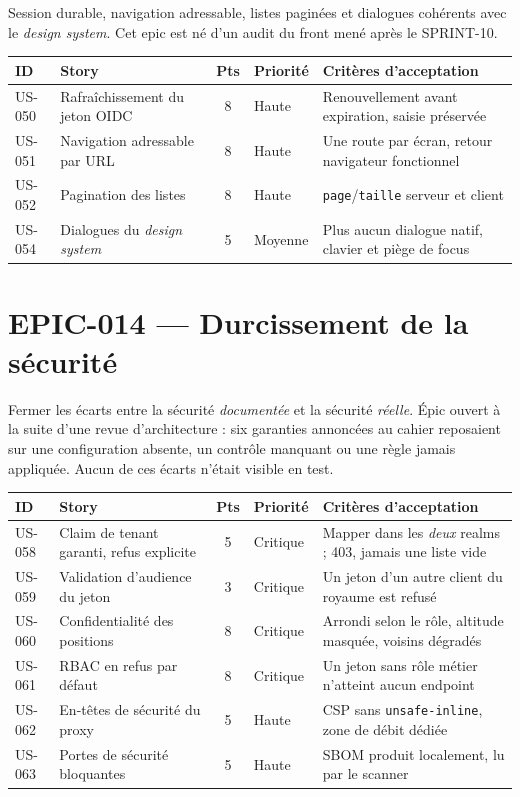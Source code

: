 Session durable, navigation adressable, listes paginées et dialogues cohérents
avec le \emph{design system}. Cet epic est né d'un audit du front mené après le
SPRINT-10.

\begin{center}
\begin{tabular}{lp{6.6cm}cl p{4.6cm}}
\toprule
\textbf{ID} & \textbf{Story} & \textbf{Pts} & \textbf{Priorité} & \textbf{Critères d'acceptation} \\
\midrule
US-050 & Rafraîchissement du jeton OIDC      & 8  & Haute   & Renouvellement avant expiration, saisie préservée \\
US-051 & Navigation adressable par URL       & 8  & Haute   & Une route par écran, retour navigateur fonctionnel \\
US-052 & Pagination des listes               & 8  & Haute   & \texttt{page}/\texttt{taille} serveur et client \\
US-054 & Dialogues du \emph{design system}   & 5  & Moyenne & Plus aucun dialogue natif, clavier et piège de focus \\
\bottomrule
\end{tabular}
\end{center}

\section{EPIC-014 --- Durcissement de la sécurité}

Fermer les écarts entre la sécurité \emph{documentée} et la sécurité
\emph{réelle}. Épic ouvert à la suite d'une revue d'architecture : six garanties
annoncées au cahier reposaient sur une configuration absente, un contrôle
manquant ou une règle jamais appliquée. Aucun de ces écarts n'était visible en
test.

\begin{center}
\begin{tabular}{lp{6.6cm}cl p{4.6cm}}
\toprule
\textbf{ID} & \textbf{Story} & \textbf{Pts} & \textbf{Priorité} & \textbf{Critères d'acceptation} \\
\midrule
US-058 & Claim de tenant garanti, refus explicite & 5 & Critique & Mapper dans les \emph{deux} realms ; 403, jamais une liste vide \\
US-059 & Validation d'audience du jeton           & 3 & Critique & Un jeton d'un autre client du royaume est refusé \\
US-060 & Confidentialité des positions            & 8 & Critique & Arrondi selon le rôle, altitude masquée, voisins dégradés \\
US-061 & RBAC en refus par défaut                 & 8 & Critique & Un jeton sans rôle métier n'atteint aucun endpoint \\
US-062 & En-têtes de sécurité du proxy            & 5 & Haute    & CSP sans \texttt{unsafe-inline}, zone de débit dédiée \\
US-063 & Portes de sécurité bloquantes            & 5 & Haute    & SBOM produit localement, lu par le scanner \\
\bottomrule
\end{tabular}
\end{center}

